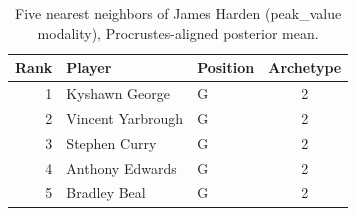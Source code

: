 \begin{table}[htbp]
  \centering\small
  \begin{tabular}{rllc}
    \toprule
    Rank & Player & Position & Archetype \\
    \midrule
    1 & Kyshawn George & G & 2 \\
    2 & Vincent Yarbrough & G & 2 \\
    3 & Stephen Curry & G & 2 \\
    4 & Anthony Edwards & G & 2 \\
    5 & Bradley Beal & G & 2 \\
    \bottomrule
  \end{tabular}
  \caption{Five nearest neighbors of James Harden (peak_value modality), Procrustes-aligned posterior mean.}
  \label{tab:James_Harden_neighbors_peak_value}
\end{table}

